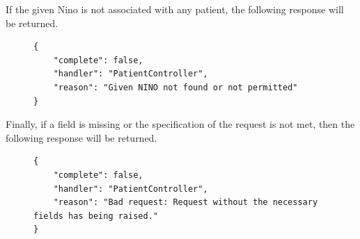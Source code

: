 					If the given Nino is not associated with any patient, the following response will be returned.
					\begin{figure}[H]
						\iftrue
						\begin{lstlisting}[]
{
	"complete": false,
	"handler": "PatientController",
	"reason": "Given NINO not found or not permitted"
}
						\end{lstlisting}
					\end{figure}
					Finally, if a field is missing or the specification of the request is not met, then the following response will be returned.
					\begin{figure}[H]
						\iftrue
						\begin{lstlisting}[]
{
	"complete": false,
	"handler": "PatientController",
	"reason": "Bad request: Request without the necessary fields has being raised."
}					
						\end{lstlisting}
					\end{figure}
